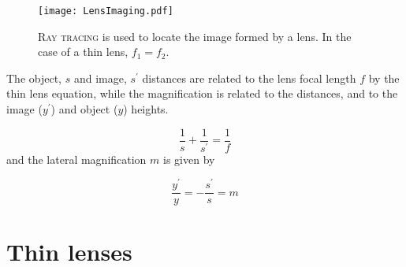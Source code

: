 \begin{figure*}
	\hfill\texttt{[image: LensImaging.pdf]}
	\caption[Ray Tracing Lens Image]{\textsc{Ray tracing} is used to locate the image formed by a lens.  In the case of a thin lens, $f_{1}=f_{2}$.}
	\label{f:fig17}
	\forceversofloat
\end{figure*}

The object, $s$ and image, $s^{\prime}$ distances are related to the lens focal length $f$ by the thin lens equation, while the magnification is related to the distances, and to the image ($y^{\prime}$) and object ($y$) heights.

\begin{equation} \label{e:thin}
	\frac{1}{s} + \frac{1}{s^{\prime}} = \frac{1}{f}
\end{equation}
and the lateral magnification $m$ is given by

\begin{equation} \label{e:thinmag}
	\frac{y^{\prime}}{y} = -\frac{s^{\prime}}{s} = m
\end{equation}

\section {Thin lenses}
